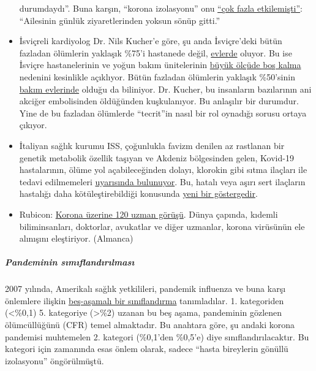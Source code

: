 \begin{itemize}
  durumdaydı''. Buna karşın, ``korona izolasyonu'' onu
  \href{https://swprs.files.wordpress.com/2020/04/tagblatt-109.jpg}{``çok
  fazla etkilemişti''}: ``Ailesinin günlük ziyaretlerinden yoksun sönüp
  gitti.''
\item
  İsviçreli kardiyolog Dr. Nils Kucher'e göre, şu anda İsviçre'deki
  bütün fazladan ölümlerin yaklaşık \%75'i hastanede değil,
  \href{https://www.tagesspiegel.de/wissen/woran-sterben-corona-patienten-wirklich-ein-schweizer-forscher-macht-hoffnung-im-kampf-gegen-covid-19/25750666.html}{evlerde}
  oluyor. Bu ise İsviçre hastanelerinin ve yoğun bakım ünitelerinin
  \href{https://swprs.files.wordpress.com/2020/04/intensivbettenbelegung-schweiz-2020-04-14.png}{büyük
  ölçüde boş kalma} nedenini kesinlikle açıklıyor. Bütün fazladan
  ölümlerin yaklaşık \%50'sinin
  \href{https://www.nzz.ch/zuerich/coronavirus-zuerich-aendert-nun-das-testregime-in-heimenauch-viele-aeltere-covid-19-infizierte-entwickeln-keine-symptome-zuerich-aendert-nun-das-testregime-in-heimen-ld.1552089}{bakım
  evlerinde} olduğu da biliniyor. Dr. Kucher, bu insanların bazılarının
  ani akciğer embolisinden öldüğünden kuşkulanıyor. Bu anlaşılır bir
  durumdur. Yine de bu fazladan ölümlerde ``tecrit''in nasıl bir rol
  oynadığı sorusu ortaya çıkıyor.
\item
  İtaliyan sağlık kurumu ISS, çoğunlukla favizm denilen az rastlanan bir
  genetik metabolik özellik taşıyan ve Akdeniz bölgesinden gelen,
  Kovid-19 hastalarının, ölüme yol açabileceğinden dolayı, klorokin gibi
  sıtma ilaçları ile tedavi edilmemeleri
  \href{https://www.iss.it/en/rapporti-covid-19/-/asset_publisher/btw1J82wtYzH/content/id/5334891}{uyarısında
  bulunuyor}. Bu, hatalı veya aşırı sert ilaçların hastalığı daha
  kötüleştirebildiği konusunda
  \href{https://www.sciencedaily.com/releases/2020/02/200206110703.htm}{yeni
  bir göstergedir}.
\item
  Rubicon:
  \href{https://www.rubikon.news/artikel/120-expertenstimmen-zu-corona}{Korona
  üzerine 120 uzman görüşü}. Dünya çapında, kıdemli biliminsanları,
  doktorlar, avukatlar ve diğer uzmanlar, korona virüsünün ele alınışını
  eleştiriyor. (Almanca)
\end{itemize}

\hypertarget{pandeminin-sux131mux131flandux131rux131lmasux131}{%
\subparagraph{\texorpdfstring{\textbf{Pandeminin
sımıflandırılması}}{Pandeminin sımıflandırılması}}\label{pandeminin-sux131mux131flandux131rux131lmasux131}}

2007 yılında, Amerikalı sağlık yetkilileri, pandemik influenza ve buna
karşı önlemlere ilişkin
\href{https://www.cidrap.umn.edu/news-perspective/2007/02/hhs-ties-pandemic-mitigation-advice-severity}{beş-aşamalı
bir sınıflandırma} tanımladılar. 1. kategoriden (\textless{}\%0,1) 5.
kategoriye (\textgreater{}\%2) uzanan bu beş aşama, pandeminin gözlenen
ölümcüllüğünü (CFR) temel almaktadır. Bu anahtara göre, şu andaki korona
pandemisi muhtemelen 2. kategori (\%0,1'den \%0,5'e) diye
sınıflandırılacaktır. Bu kategori için zamanında esas önlem olarak,
sadece ``hasta bireylerin gönüllü izolasyonu'' öngörülmüştü.

